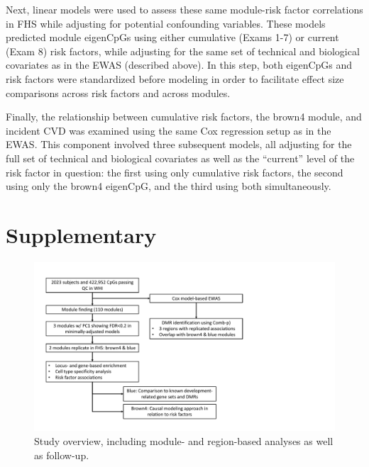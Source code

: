 \documentclass[]{article}
\theoremstyle{definition}
\theoremstyle{definition}
\theoremstyle{definition}
\theoremstyle{remark}
\begin{document}
Next, linear models were used to assess these same module-risk factor
correlations in FHS while adjusting for potential confounding variables.
These models predicted module eigenCpGs using either cumulative (Exams
1-7) or current (Exam 8) risk factors, while adjusting for the same set
of technical and biological covariates as in the EWAS (described above).
In this step, both eigenCpGs and risk factors were standardized before
modeling in order to facilitate effect size comparisons across risk
factors and across modules.

Finally, the relationship between cumulative risk factors, the brown4
module, and incident CVD was examined using the same Cox regression
setup as in the EWAS. This component involved three subsequent models,
all adjusting for the full set of technical and biological covariates as
well as the ``current'' level of the risk factor in question: the first
using only cumulative risk factors, the second using only the brown4
eigenCpG, and the third using both simultaneously.

\newpage

\section{Supplementary}\label{supplementary}

\newcommand{\beginsupplement}{
  \setcounter{table}{0}  
  \renewcommand{\thetable}{S\arabic{table}} 
  \setcounter{figure}{0} 
  \renewcommand{\thefigure}{S\arabic{figure}}
}

\beginsupplement

\begin{figure}[htbp]
\centering
\includegraphics{../doc/figures/workflow.pdf}
\caption{\label{fig:workflow}Study overview, including module- and
region-based analyses as well as follow-up.}
\end{figure}
\end{document}
